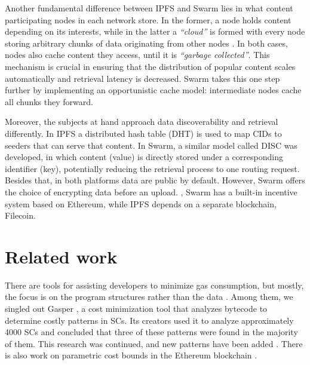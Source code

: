 Another fundamental difference between IPFS and Swarm lies in what content participating nodes in each network store. In the former, a node holds content depending on its interests, while in the latter a \emph{``cloud''} is formed with every node storing arbitrary chunks of data originating from other nodes \citep{swarmwiki_2019}. In both cases, nodes also cache content they access, until it is \emph{``garbage collected''}. This mechanism is crucial in ensuring that the distribution of popular content scales automatically and retrieval latency is decreased. Swarm takes this one step further by implementing an opportunistic cache model: intermediate nodes cache all chunks they forward.

Moreover, the subjects at hand approach data discoverability and retrieval differently. In IPFS a distributed hash table (DHT) \citep{benet_2014} is used to map CIDs to seeders that can serve that content. In Swarm, a similar model called DISC  \citep{tron_2020} was developed, in which content (value) is directly stored under a corresponding identifier (key), potentially reducing the retrieval process to one routing request. Besides that, in both platforms data are public by default. However, Swarm offers the choice of encrypting data before an upload. , Swarm has a built-in incentive system based on Ethereum, while IPFS depends on a separate blockchain, Filecoin. 

\section{Related work}\label{sec:related_work}
There are tools for assisting developers to minimize gas consumption, but mostly, the focus is on the program structures rather than the data  \citep{nelaturu_2021, chen_2017, chen_2021}. Among them, we singled out Gasper  \citep{chen_2017}, a cost minimization tool that analyzes bytecode to determine costly patterns in SCs. Its creators used it to analyze approximately 4000 SCs and concluded that three of these patterns were found in the majority of them. This research was continued, and new patterns have been added  \citep{chen_2021}. There is also work on parametric cost bounds in the Ethereum blockchain \citep{albert_2021}.

